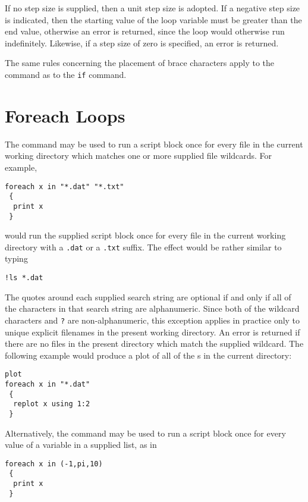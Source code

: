 If no step size is supplied, then a unit step size is adopted. If a negative
step size is indicated, then the starting value of the loop variable must be
greater than the end value, otherwise an error is returned, since the loop
would otherwise run indefinitely. Likewise, if a step size of zero is
specified, an error is returned.

The same rules concerning the placement of brace characters apply to the
 command as to the {\tt if} command.

\section{Foreach Loops}

The  command may be used to run a script block once for every
file in the current working directory which matches one or more supplied file
wildcards.  For example,

\begin{verbatim}
foreach x in "*.dat" "*.txt"
 {
  print x
 }
\end{verbatim}

\noindent would run the supplied script block once for every file in the
current working directory with a {\tt .dat} or a {\tt .txt} suffix. The effect
would be rather similar to typing

\begin{verbatim}
!ls *.dat
\end{verbatim}

The quotes around each supplied search string are optional if and only if all
of the characters in that search string are alphanumeric. Since both of the
wildcard characters {\tt *} and {\tt ?} are non-alphanumeric, this exception
applies in practice only to unique explicit filenames in the present working
directory.  An error is returned if there are no files in the present directory
which match the supplied wildcard. The following example would produce a plot
of all of the \datafile s in the current directory:

\begin{verbatim}
plot
foreach x in "*.dat"
 {
  replot x using 1:2
 }
\end{verbatim}

Alternatively, the  command may be used to run a script block
once for every value of a variable in a supplied list, as in

\begin{verbatim}
foreach x in (-1,pi,10)
 {
  print x
 }
\end{verbatim}

